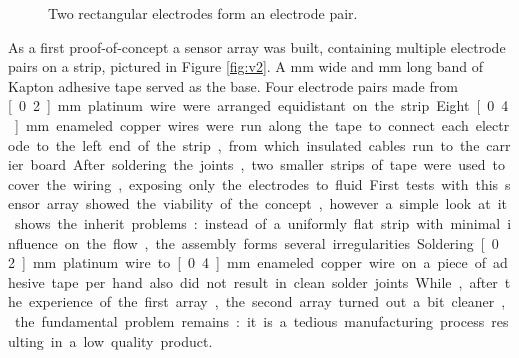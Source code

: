 \begin{figure}[H]
	\begin{center}
		\caption{Two rectangular electrodes form an electrode pair.}
		\label{fig:sensor}
	\end{center}
\end{figure}

As a first proof-of-concept a sensor array was built, containing multiple electrode pairs on a strip, pictured in Figure \ref{fig:v2}. A \unit[50]{mm} wide and \unit[250]{mm} long band of Kapton adhesive tape served as the base. Four electrode pairs made from \unit[0.2]{mm} platinum wire were arranged equidistant on the strip. Eight \unit[0.4]{mm} enameled copper wires were run along the tape to connect each electrode to the left end of the strip, from which insulated cables run to the carrier board. After soldering the joints, two smaller strips of tape were used to cover the wiring, exposing only the electrodes to fluid.

First tests with this sensor array showed the viability of the concept, however a simple look at it shows the inherit problems: instead of a uniformly flat strip with minimal influence on the flow, the assembly forms several irregularities. Soldering \unit[0.2]{mm} platinum wire to \unit[0.4]{mm} enameled copper wire on a piece of adhesive tape per hand also did not result in clean solder joints. While, after the experience of the first array, the second array turned out a bit cleaner, the fundamental problem remains: it is a tedious manufacturing process resulting in a low quality product.

